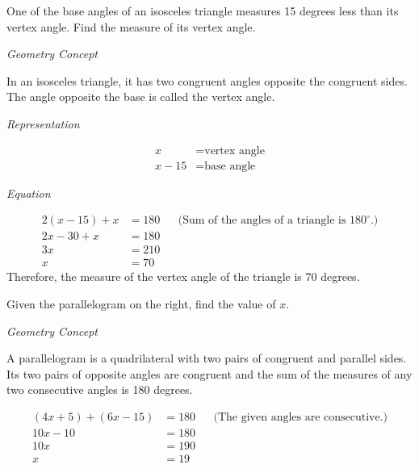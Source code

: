 \begin{example}
\Item One of the base angles of an isosceles triangle measures 15 degrees less than its vertex angle. Find the
measure of its vertex angle.

\textit{Geometry Concept}

In an isosceles triangle, it has two congruent angles opposite the congruent sides. The angle opposite
the base is called the vertex angle.

\Solution

\textit{Representation}

\begin{align*}
x&=\text{vertex angle}\\
x-15 &= \text{base angle}
\end{align*}

\textit{Equation}

\begin{align*}
2(x - 15) + x &= 180 && \text{(Sum of the angles of a triangle is $180^{\circ}$.)}\\
2x - 30 + x &= 180\\
3x &= 210\\
x &= 70
\end{align*}
Therefore, the measure of the vertex angle of the triangle is 70 degrees.
\end{example}

\begin{example}
\Item Given the parallelogram on the right, find the value of $x$.


\textit{Geometry Concept}

A parallelogram is a quadrilateral with two pairs of congruent and parallel sides. Its two pairs of opposite
angles are congruent and the sum of the measures of any two consecutive angles is 180 degrees.

\Solution

\begin{align*}
(4x + 5) + (6x - 15) &= 180 && \text{(The given angles are consecutive.)}\\
10x - 10 &= 180\\
10x &= 190\\
x &= 19
\end{align*}
\end{example}

